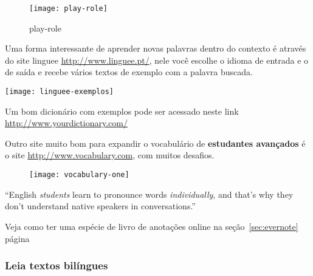 \begin{figure}[h!]
	\centering
	\texttt{[image: play-role]}
	\caption{play-role}
\end{figure}

 Uma forma interessante de aprender
novas palavras dentro do contexto é através do site linguee
\href{http://www.linguee.pt/}{http://www.linguee.pt/}, nele você escolhe
o idioma de entrada e o de saída e recebe vários textos de exemplo com
a palavra buscada.

\texttt{[image: linguee-exemplos]}

\noindent
{\footnotesize {} Um bom dicionário com exemplos pode ser acessado neste link \href{http://www.yourdictionary.com/}{http://www.yourdictionary.com/} }

\noindent
Outro site muito bom para expandir o vocabulário de {\bf estudantes avançados} é o site
\href{http://www.vocabulary.com}{http://www.vocabulary.com}, com muitos desafios.

\begin{figure}[h!]
	\centering
	\texttt{[image: vocabulary-one]}
\end{figure}


\noindent
\vspace{0.3\baselineskip}
{\footnotesize {}  ``English {\em students} learn to pronounce words {\em individually},
and that's why they don't understand native speakers in conversations.''}

\vspace{0.3\baselineskip}
\noindent
{\footnotesize {} Veja como ter uma espécie de livro de anotações online
na seção~\ref{sec:evernote} página~\pageref{sec:evernote}}

\subsubsection{Leia textos bilíngues}
\label{ssub:leia_textos_bil_ngues}

